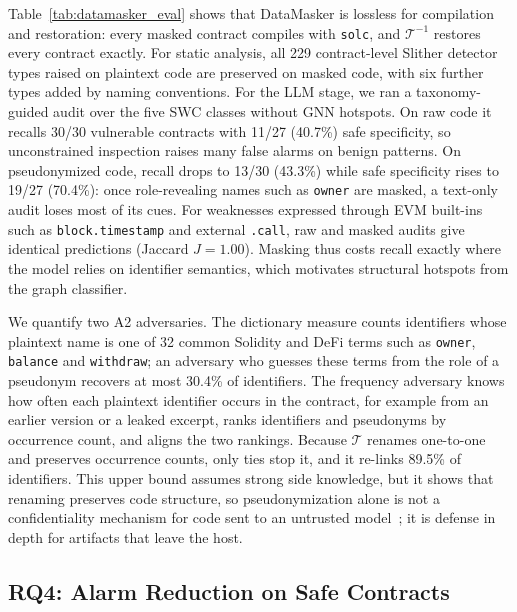 \documentclass[runningheads]{llncs}
\makeatletter
\renewcommand\paragraph{\@startsection{paragraph}{4}{\parindent}{\z@}{-0.5em}{\normalfont\itshape}}
\makeatother
\begin{document}
\paragraph{Utility.} Table~\ref{tab:datamasker_eval} shows that DataMasker is lossless for compilation and restoration: every masked contract compiles with \texttt{solc}, and $\mathcal{T}^{-1}$ restores every contract exactly. For static analysis, all 229 contract-level Slither detector types raised on plaintext code are preserved on masked code, with six further types added by naming conventions. For the LLM stage, we ran a taxonomy-guided audit over the five SWC classes without GNN hotspots. On raw code it recalls 30/30 vulnerable contracts with 11/27 (40.7\%) safe specificity, so unconstrained inspection raises many false alarms on benign patterns. On pseudonymized code, recall drops to 13/30 (43.3\%) while safe specificity rises to 19/27 (70.4\%): once role-revealing names such as \texttt{owner} are masked, a text-only audit loses most of its cues. For weaknesses expressed through EVM built-ins such as \texttt{block.timestamp} and external \texttt{.call}, raw and masked audits give identical predictions (Jaccard $J=1.00$). Masking thus costs recall exactly where the model relies on identifier semantics, which motivates structural hotspots from the graph classifier.

\paragraph{Exposure.} We quantify two A2 adversaries. The dictionary measure counts identifiers whose plaintext name is one of 32 common Solidity and DeFi terms such as \texttt{owner}, \texttt{balance} and \texttt{withdraw}; an adversary who guesses these terms from the role of a pseudonym recovers at most 30.4\% of identifiers. The frequency adversary knows how often each plaintext identifier occurs in the contract, for example from an earlier version or a leaked excerpt, ranks identifiers and pseudonyms by occurrence count, and aligns the two rankings. Because $\mathcal{T}$ renames one-to-one and preserves occurrence counts, only ties stop it, and it re-links 89.5\% of identifiers. This upper bound assumes strong side knowledge, but it shows that renaming preserves code structure, so pseudonymization alone is not a confidentiality mechanism for code sent to an untrusted model~\cite{xie2024resym,xu2025gennm,noah2025codecloak}; it is defense in depth for artifacts that leave the host.

\subsection{RQ4: Alarm Reduction on Safe Contracts}
\label{sec:rq4}
\end{document}
